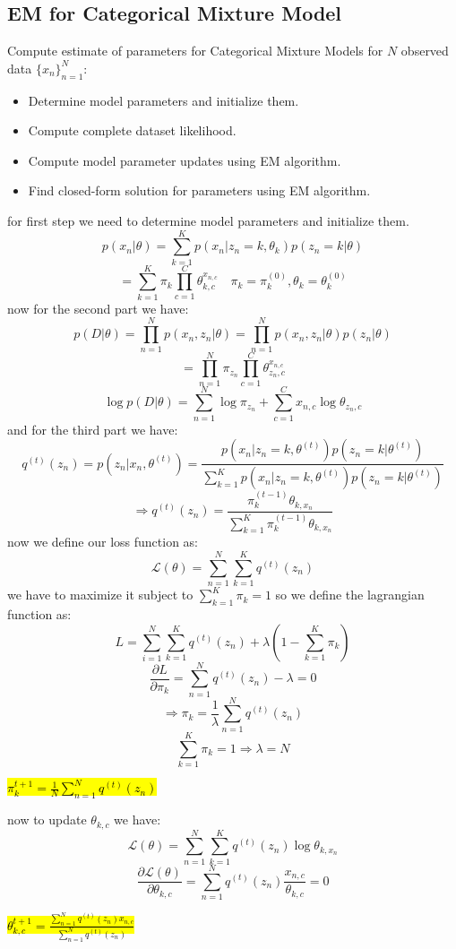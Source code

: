 \subsection{EM for Categorical Mixture Model}

Compute estimate of parameters for Categorical Mixture Models for $N$ observed data $\{x_n\}^N_{n=1}$:
\begin{itemize}
    \item Determine model parameters and initialize them.
    \item Compute complete dataset likelihood.
    \item Compute model parameter updates using EM algorithm.
    \item Find closed-form solution for parameters using EM algorithm.
\end{itemize}
\begin{qsolve}
    \begin{qsolve}[]
        for first step we need to determine model parameters and initialize them.
        $$p(x_n|\theta) = \sum_{k=1}^{K} p(x_n|z_n=k,\theta_k)p(z_n=k|\theta)$$
        $$= \sum_{k=1}^{K} \pi_k \prod_{c=1}^{C} \theta_{k,c}^{x_{n,c}} \quad \pi_k = \pi_k^{(0)} , \theta_k = \theta_k^{(0)}$$
        now for the second part we have:
        $$p(D|\theta) = \prod_{n=1}^{N} p(x_n, z_n|\theta) = \prod_{n=1}^{N} p(x_n,z_n|\theta)p(z_n|\theta)$$
        $$= \prod_{n=1}^{N} \pi_{z_n} \prod_{c=1}^{C} \theta_{z_n,c}^{x_{n,c}}$$
        $$\log p(D|\theta) = \sum_{n=1}^{N} \log \pi_{z_n} + \sum_{c=1}^{C} x_{n,c} \log \theta_{z_n,c}$$
        and for the third part we have:
        $$q^{(t)}(z_n) = p(z_n|x_n,\theta^{(t)}) = \frac{p(x_n|z_n=k , \theta^{(t)})p(z_n=k|\theta^{(t)})}{\sum_{k=1}^{K} p(x_n|z_n=k , \theta^{(t)})p(z_n=k|\theta^{(t)})}$$
        $$\Rightarrow q^{(t)}(z_n) = \frac{\pi_k^{(t-1)} \theta_{k,x_n}}{\sum_{k=1}^{K} \pi_k^{(t-1)} \theta_{k,x_n}}$$
        now we define our loss function as:
        $$\mathcal{L}(\theta) = \sum_{n=1}^{N} \sum_{k=1}^{K} q^{(t)}(z_n) $$
        we have to maximize it subject to $\sum_{k=1}^{K}\pi_k = 1$ so we define the lagrangian function as:
        $$L = \sum_{i=1}^{N} \sum_{k=1}^{K} q^{(t)}(z_n) + \lambda(1- \sum_{k=1}^{K}\pi_k)$$
        $$\frac{\partial L}{\partial \pi_k} = \sum_{n=1}^{N} q^{(t)}(z_n) - \lambda = 0$$
        $$\Rightarrow \pi_k = \frac{1}{\lambda} \sum_{n=1}^{N} q^{(t)}(z_n)$$
        $$\sum_{k=1}^{K} \pi_k = 1 \Rightarrow \lambda = N$$
        \begin{center}
            \hl{$\pi_k^{t+1} = \frac{1}{N} \sum_{n=1}^{N} q^{(t)}(z_n)$}
        \end{center}
        \splitqsolve[\splitqsolve]
        now to update $\theta_{k,c}$ we have:
        $$\mathcal{L}(\theta) = \sum_{n=1}^{N} \sum_{k=1}^{K} q^{(t)}(z_n) \log \theta_{k,x_n}$$
        $$\frac{\partial \mathcal{L}(\theta)}{\partial \theta_{k,c}} = \sum_{n=1}^{N} q^{(t)}(z_n) \frac{x_{n,c}}{\theta_{k,c}} = 0$$
        \begin{center}
            \hl{$\theta_{k,c}^{t+1} = \frac{\sum_{n=1}^{N} q^{(t)}(z_n) x_{n,c}}{\sum_{n=1}^{N} q^{(t)}(z_n)}$}
        \end{center}
    \end{qsolve}
\end{qsolve}